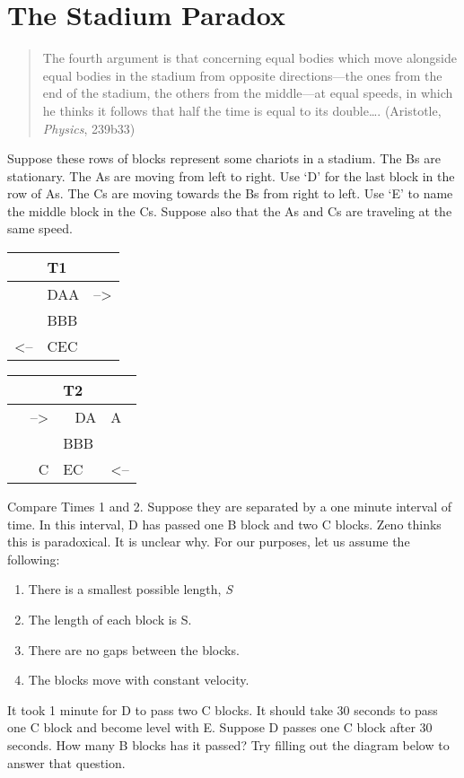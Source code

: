 \documentclass[oneside]{article}
\begin{document}
\section{The Stadium Paradox}\label{stadium-paradox}

\begin{quote}
The fourth argument is that concerning equal bodies which move alongside equal bodies in the stadium from opposite directions---the ones from the end of the stadium, the others from the middle---at equal speeds, in which he thinks it follows that half the time is equal to its
double\ldots{}. (Aristotle, \emph{Physics}, 239b33)
\end{quote}
Suppose these rows of blocks represent some chariots in a stadium. The
Bs are stationary. The As are moving from left to right. Use `D' for the last block in the row of As. The Cs are moving towards the Bs from right to left. Use `E' to name the middle block in the Cs. Suppose also that the As and Cs are traveling at the same speed.

\begin{longtable}[c]{@{}lll@{}}
\toprule
& T1 &\tabularnewline
\midrule
\endhead
& DAA & --\textgreater{}\tabularnewline
& BBB &\tabularnewline
\textless{}-- & CEC &\tabularnewline
\bottomrule
\end{longtable}

\begin{longtable}[c]{@{}rll@{}}
\toprule
& T2 &\tabularnewline
\midrule
\endhead
--\textgreater{} & ~ DA & A\tabularnewline
& BBB &\tabularnewline
~ ~ C & EC~ & \textless{}--\tabularnewline
\bottomrule
\end{longtable}
Compare Times 1 and 2. Suppose they are separated by a one minute
interval of time. In this interval, D has passed one B block and two C blocks. Zeno thinks this is paradoxical. It is unclear why. For our purposes, let us assume the following:

\begin{enumerate}
\item
  There is a smallest possible length, \emph{S}
\item
  The length of each block is S.
\item
  There are no gaps between the blocks.
\item
  The blocks move with constant velocity.
\end{enumerate}
It took 1 minute for D to pass two C blocks. It should take 30 seconds to
pass one C block and become level with E. Suppose D passes one C block after 30 seconds. How many B blocks has it passed? Try filling out the diagram below to answer that question.
\end{document}
